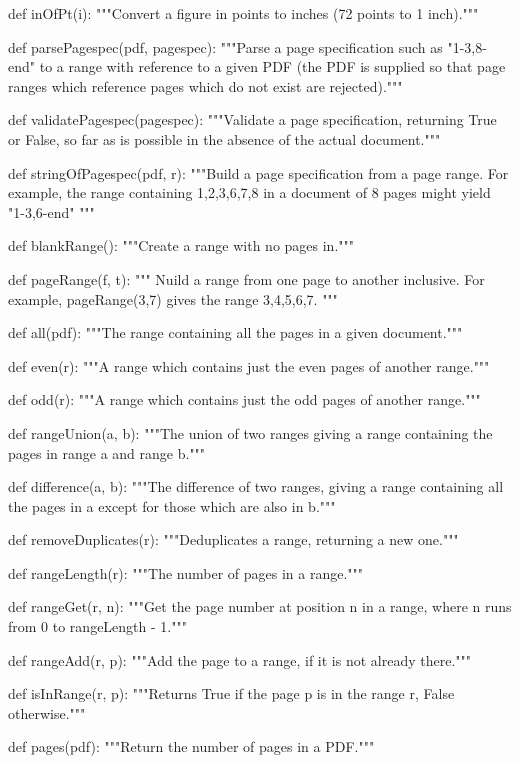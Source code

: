 def inOfPt(i):
    """Convert a figure in points to inches (72 points to 1 inch)."""

def parsePagespec(pdf, pagespec):
    """Parse a page specification such as "1-3,8-end" to a range with reference
    to a given PDF (the PDF is supplied so that page ranges which reference
    pages which do not exist are rejected)."""

def validatePagespec(pagespec):
    """Validate a page specification, returning True or False, so far as is
    possible in the absence of the actual document."""

def stringOfPagespec(pdf, r):
    """Build a page specification from a page
    range. For example, the range containing 1,2,3,6,7,8 in a document of 8
    pages might yield "1-3,6-end" """

def blankRange():
    """Create a range with no pages in."""

def pageRange(f, t):
    """ Nuild a range from one page to another inclusive.
    For example, pageRange(3,7) gives the range 3,4,5,6,7. """

def all(pdf):
    """The range containing all the pages in a given document."""

def even(r):
    """A range which contains just the even pages of another
    range."""

def odd(r):
    """A range which contains just the odd pages of another
    range."""

def rangeUnion(a, b):
    """The union of two ranges giving a range containing
    the pages in range a and range b."""

def difference(a, b):
    """The difference of two ranges, giving a range
    containing all the pages in a except for those which are also in b."""

def removeDuplicates(r):
    """Deduplicates a range, returning a new one."""

def rangeLength(r):
    """The number of pages in a range."""

def rangeGet(r, n):
    """Get the page number at position n in a range, where
    n runs from 0 to rangeLength - 1."""

def rangeAdd(r, p):
    """Add the page to a range, if it is not already
    there."""

def isInRange(r, p):
    """Returns True if the page p is in the range r, False otherwise."""

def pages(pdf):
    """Return the number of pages in a PDF."""


